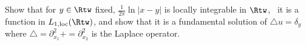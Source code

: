 Show that for $y\in \Rtw$ fixed, $\frac{1}{2\pi}\ln|x-y|$ is locally
integrable in $\Rtw$, \ie\ it is a function in
$L_{1,\mathrm{loc}}(\Rtw)$, and show that it is a fundamental solution
of $\triangle u=\delta_y$ where $\triangle = \partial_{x_1}^2+=
\partial_{x_2}^2$ is the Laplace operator.

